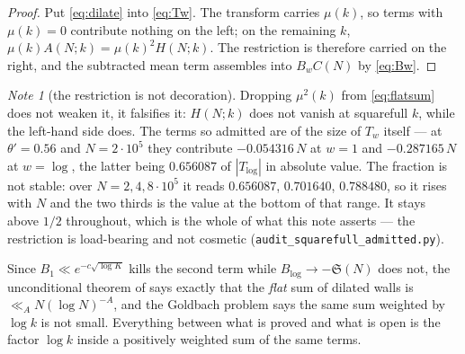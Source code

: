 \documentclass[11pt,a4paper]{article}
\theoremstyle{plain}
\theoremstyle{definition}
\theoremstyle{remark}
\newtheorem{note}[theorem]{Note}
\renewcommand{\SS}{\mathfrak{S}}
\begin{document}
\begin{proof}
Put \eqref{eq:dilate} into \eqref{eq:Tw}. The transform carries
$\mu(k)$, so terms with $\mu(k)=0$ contribute nothing on the left; on
the remaining $k$, $\mu(k)A(N;k)=\mu(k)^2H(N;k)$. The restriction is
therefore carried on the right, and the subtracted mean term assembles
into $B_wC(N)$ by \eqref{eq:Bw}.
\end{proof}

\begin{note}[the restriction is not decoration]
Dropping $\mu^2(k)$ from \eqref{eq:flatsum} does not weaken it, it
falsifies it: $H(N;k)$ does not vanish at squarefull $k$, while the
left-hand side does. The terms so admitted are of the size of $T_w$
itself --- at $\theta'=0.56$ and $N=2\cdot10^{5}$ they contribute
$-0.054316\,N$ at $w=1$ and $-0.287165\,N$ at $w=\log$, the latter
being $0.656087$ of $|T_{\log}|$ in absolute value. The fraction is not stable: over
$N=2,4,8\cdot10^{5}$ it reads $0.656087$, $0.701640$, $0.788480$, so
it rises with $N$ and the two thirds is the value at the bottom of
that range. It stays above $1/2$ throughout, which is the whole of
what this note asserts --- the restriction is load-bearing and not
cosmetic (\texttt{audit\_squarefull\_admitted.py}).
\end{note}

Since $B_1\ll e^{-c\sqrt{\log K}}$ kills the second term while
$B_{\log}\to-\SS(N)$ does not, the unconditional theorem of \cite{P1}
says exactly that the \emph{flat} sum of dilated walls is
$\ll_AN(\log N)^{-A}$, and the Goldbach problem says the same sum
weighted by $\log k$ is not small. Everything between what is proved
and what is open is the factor $\log k$ inside a positively weighted
sum of the same terms.
\end{document}
